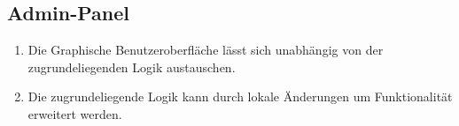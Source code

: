 \subsection{Admin-Panel}

\begin{enumerate}
    \item Die Graphische Benutzeroberfläche lässt sich unabhängig von der zugrundeliegenden Logik austauschen.
    \item Die zugrundeliegende Logik kann durch lokale Änderungen um Funktionalität erweitert werden.
\end{enumerate}